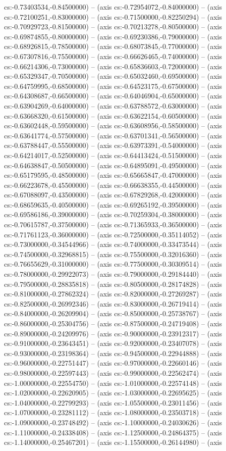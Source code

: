 cs:-0.73403534,-0.84500000) -- (axis cs:-0.72954072,-0.84000000) -- (axis cs:-0.72100251,-0.83000000) -- (axis cs:-0.71500000,-0.82250294) -- (axis cs:-0.70929723,-0.81500000) -- (axis cs:-0.70213278,-0.80500000) -- (axis cs:-0.69874855,-0.80000000) -- (axis cs:-0.69230386,-0.79000000) -- (axis cs:-0.68926815,-0.78500000) -- (axis cs:-0.68073845,-0.77000000) -- (axis cs:-0.67307816,-0.75500000) -- (axis cs:-0.66626465,-0.74000000) -- (axis cs:-0.66214306,-0.73000000) -- (axis cs:-0.65836603,-0.72000000) -- (axis cs:-0.65329347,-0.70500000) -- (axis cs:-0.65032460,-0.69500000) -- (axis cs:-0.64759995,-0.68500000) -- (axis cs:-0.64523175,-0.67500000) -- (axis cs:-0.64308687,-0.66500000) -- (axis cs:-0.64046904,-0.65000000) -- (axis cs:-0.63904269,-0.64000000) -- (axis cs:-0.63788572,-0.63000000) -- (axis cs:-0.63668320,-0.61500000) -- (axis cs:-0.63622154,-0.60500000) -- (axis cs:-0.63602448,-0.59500000) -- (axis cs:-0.63608956,-0.58500000) -- (axis cs:-0.63641774,-0.57500000) -- (axis cs:-0.63701341,-0.56500000) -- (axis cs:-0.63788447,-0.55500000) -- (axis cs:-0.63973391,-0.54000000) -- (axis cs:-0.64214017,-0.52500000) -- (axis cs:-0.64413424,-0.51500000) -- (axis cs:-0.64638847,-0.50500000) -- (axis cs:-0.64895091,-0.49500000) -- (axis cs:-0.65179595,-0.48500000) -- (axis cs:-0.65665847,-0.47000000) -- (axis cs:-0.66223678,-0.45500000) -- (axis cs:-0.66638355,-0.44500000) -- (axis cs:-0.67088097,-0.43500000) -- (axis cs:-0.67829268,-0.42000000) -- (axis cs:-0.68659635,-0.40500000) -- (axis cs:-0.69265192,-0.39500000) -- (axis cs:-0.69586186,-0.39000000) -- (axis cs:-0.70259304,-0.38000000) -- (axis cs:-0.70615787,-0.37500000) -- (axis cs:-0.71365933,-0.36500000) -- (axis cs:-0.71761123,-0.36000000) -- (axis cs:-0.72500000,-0.35114052) -- (axis cs:-0.73000000,-0.34544966) -- (axis cs:-0.74000000,-0.33473544) -- (axis cs:-0.74500000,-0.32968815) -- (axis cs:-0.75500000,-0.32016360) -- (axis cs:-0.76655629,-0.31000000) -- (axis cs:-0.77500000,-0.30309514) -- (axis cs:-0.78000000,-0.29922073) -- (axis cs:-0.79000000,-0.29184440) -- (axis cs:-0.79500000,-0.28835818) -- (axis cs:-0.80500000,-0.28174828) -- (axis cs:-0.81000000,-0.27862324) -- (axis cs:-0.82000000,-0.27269287) -- (axis cs:-0.82500000,-0.26992346) -- (axis cs:-0.83000000,-0.26719414) -- (axis cs:-0.84000000,-0.26209904) -- (axis cs:-0.85000000,-0.25738767) -- (axis cs:-0.86000000,-0.25304756) -- (axis cs:-0.87500000,-0.24719408) -- (axis cs:-0.89000000,-0.24209976) -- (axis cs:-0.90000000,-0.23912317) -- (axis cs:-0.91000000,-0.23643451) -- (axis cs:-0.92000000,-0.23407078) -- (axis cs:-0.93000000,-0.23198364) -- (axis cs:-0.94500000,-0.22944888) -- (axis cs:-0.96000000,-0.22751447) -- (axis cs:-0.97000000,-0.22660146) -- (axis cs:-0.98000000,-0.22597443) -- (axis cs:-0.99000000,-0.22562474) -- (axis cs:-1.00000000,-0.22554750) -- (axis cs:-1.01000000,-0.22574148) -- (axis cs:-1.02000000,-0.22620905) -- (axis cs:-1.03000000,-0.22695625) -- (axis cs:-1.04000000,-0.22799293) -- (axis cs:-1.05500000,-0.23011456) -- (axis cs:-1.07000000,-0.23281112) -- (axis cs:-1.08000000,-0.23503718) -- (axis cs:-1.09000000,-0.23748492) -- (axis cs:-1.10000000,-0.24030626) -- (axis cs:-1.11000000,-0.24338408) -- (axis cs:-1.12500000,-0.24864375) -- (axis cs:-1.14000000,-0.25467201) -- (axis cs:-1.15500000,-0.26144980) -- (axis 